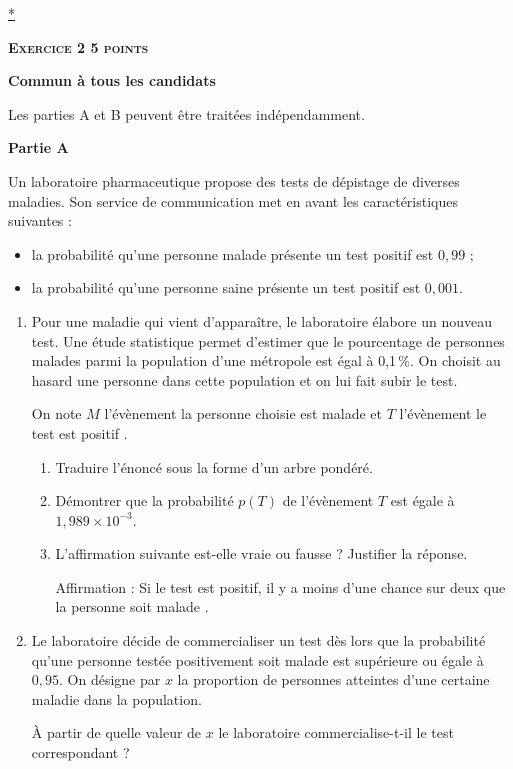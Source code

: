 \documentclass[10pt]{article}
\begin{document}
\hyperlink{Index}{*}
\vspace{0,5cm}

\textbf{\textsc{Exercice 2 \hfill 5 points}}

\textbf{Commun à tous les candidats} 

\medskip 

Les parties A et B peuvent être traitées indépendamment. 

\medskip 

\textbf{Partie A}

\medskip {}

Un laboratoire pharmaceutique propose des tests de dépistage de diverses maladies. Son service de communication met en avant les caractéristiques suivantes : 

\setlength\parindent{9mm}
\begin{itemize}
\item la probabilité qu'une personne malade présente un test positif est $0,99$ ;
\item la probabilité qu'une personne saine présente un test positif est $0,001$. 
\end{itemize}
\setlength\parindent{0mm}

\medskip

\begin{enumerate}
\item Pour une maladie qui vient d'apparaître, le laboratoire élabore un nouveau test. Une étude statistique permet d'estimer que le pourcentage de personnes malades parmi la population d'une métropole est égal à 0,1\,\%. On choisit au hasard une personne dans cette population et on lui fait subir le test. 

On note $M$ l'évènement \og la personne choisie est malade\fg{} et $T$ l'évènement \og le test est positif \fg. 
	\begin{enumerate}
		\item Traduire l'énoncé sous la forme d'un arbre pondéré. 
		\item Démontrer que la probabilité $p(T)$ de l'évènement $T$ est égale à $1,989 \times 10^{-3}$. 
		\item L'affirmation suivante est-elle vraie ou fausse ? Justifier la réponse. 

Affirmation : \og Si le test est positif, il y a moins d'une chance sur deux que la personne soit malade \fg.
	\end{enumerate} 
\item Le laboratoire décide de commercialiser un test dès lors que la probabilité qu'une personne testée positivement soit malade est supérieure ou égale à $0,95$. On désigne par $x$ la proportion de personnes atteintes d'une certaine maladie dans la population. 

À partir de quelle valeur de $x$ le laboratoire commercialise-t-il le test correspondant ? 
\end{enumerate} 
\end{document}
